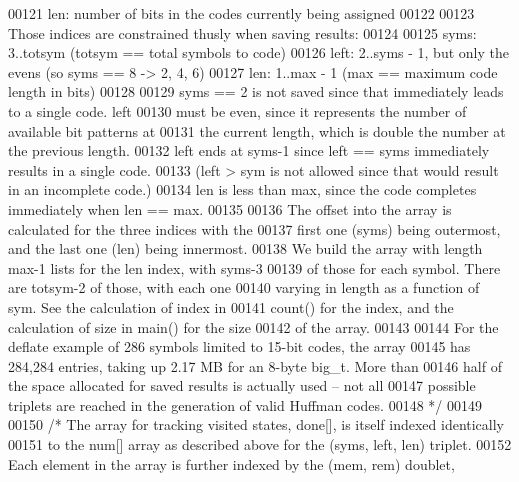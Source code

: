 \begin{DoxyCode}
00121 \textcolor{comment}{      len: number of bits in the codes currently being assigned}
00122 \textcolor{comment}{}
00123 \textcolor{comment}{   Those indices are constrained thusly when saving results:}
00124 \textcolor{comment}{}
00125 \textcolor{comment}{      syms: 3..totsym (totsym == total symbols to code)}
00126 \textcolor{comment}{      left: 2..syms - 1, but only the evens (so syms == 8 -> 2, 4, 6)}
00127 \textcolor{comment}{      len: 1..max - 1 (max == maximum code length in bits)}
00128 \textcolor{comment}{}
00129 \textcolor{comment}{   syms == 2 is not saved since that immediately leads to a single code.  left}
00130 \textcolor{comment}{   must be even, since it represents the number of available bit patterns at}
00131 \textcolor{comment}{   the current length, which is double the number at the previous length.}
00132 \textcolor{comment}{   left ends at syms-1 since left == syms immediately results in a single code.}
00133 \textcolor{comment}{   (left > sym is not allowed since that would result in an incomplete code.)}
00134 \textcolor{comment}{   len is less than max, since the code completes immediately when len == max.}
00135 \textcolor{comment}{}
00136 \textcolor{comment}{   The offset into the array is calculated for the three indices with the}
00137 \textcolor{comment}{   first one (syms) being outermost, and the last one (len) being innermost.}
00138 \textcolor{comment}{   We build the array with length max-1 lists for the len index, with syms-3}
00139 \textcolor{comment}{   of those for each symbol.  There are totsym-2 of those, with each one}
00140 \textcolor{comment}{   varying in length as a function of sym.  See the calculation of index in}
00141 \textcolor{comment}{   count() for the index, and the calculation of size in main() for the size}
00142 \textcolor{comment}{   of the array.}
00143 \textcolor{comment}{}
00144 \textcolor{comment}{   For the deflate example of 286 symbols limited to 15-bit codes, the array}
00145 \textcolor{comment}{   has 284,284 entries, taking up 2.17 MB for an 8-byte big\_t.  More than}
00146 \textcolor{comment}{   half of the space allocated for saved results is actually used -- not all}
00147 \textcolor{comment}{   possible triplets are reached in the generation of valid Huffman codes.}
00148 \textcolor{comment}{ */}
00149 
00150 \textcolor{comment}{/* The array for tracking visited states, done[], is itself indexed identically}
00151 \textcolor{comment}{   to the num[] array as described above for the (syms, left, len) triplet.}
00152 \textcolor{comment}{   Each element in the array is further indexed by the (mem, rem) doublet,}

\end{DoxyCode}
